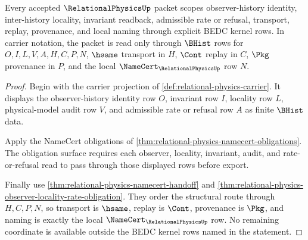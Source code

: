 \begin{theorem}
\label{thm:relational-physics-kernel-scope-closure}
Every accepted $\RelationalPhysicsUp$ packet scopes observer-history identity, inter-history locality, invariant readback, admissible rate or refusal, transport, replay, provenance, and local naming through explicit BEDC kernel rows. In carrier notation, the packet is read only through $\BHist$ rows for $O,I,L,V,A,H,C,P,N$, $\hsame$ transport in $H$, $\Cont$ replay in $C$, $\Pkg$ provenance in $P$, and the local $\NameCert_{\RelationalPhysicsUp}$ row $N$.
\end{theorem}
\begin{proof}
Begin with the carrier projection of \autoref{def:relational-physics-carrier}. It displays the observer-history identity row $O$, invariant row $I$, locality row $L$, physical-model audit row $V$, and admissible rate or refusal row $A$ as finite $\BHist$ data.

Apply the NameCert obligations of \autoref{thm:relational-physics-namecert-obligations}. The obligation surface requires each observer, locality, invariant, audit, and rate-or-refusal read to pass through those displayed rows before export.

Finally use \autoref{thm:relational-physics-namecert-handoff} and \autoref{thm:relational-physics-observer-locality-rate-obligation}. They order the structural route through $H,C,P,N$, so transport is $\hsame$, replay is $\Cont$, provenance is $\Pkg$, and naming is exactly the local $\NameCert_{\RelationalPhysicsUp}$ row. No remaining coordinate is available outside the BEDC kernel rows named in the statement.
\end{proof}



